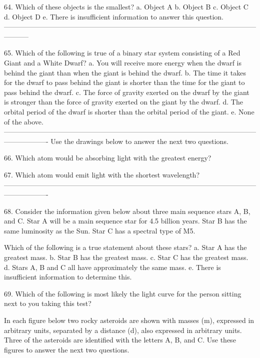 64. Which of these objects is the smallest?
a. Object A
b. Object B
c. Object C
d. Object D
e. There is insufficient information to answer this question.
-----------------------------------------------------------------------------------------------------------------------

65. Which of the following is true of a binary star system consisting of a Red Giant and a White Dwarf?
a. You will receive more energy when the dwarf is behind the giant than when the giant is behind the dwarf.
b. The time it takes for the dwarf to pass behind the giant is shorter than the time for the giant to pass behind the dwarf.
c. The force of gravity exerted on the dwarf by the giant is stronger than the force of gravity exerted on the giant by the dwarf.
d. The orbital period of the dwarf is shorter than the orbital period of the giant.
e. None of the above.
-------------------------------------------------------------------------------------------------------------------------------
Use the drawings below to answer the next two questions. 











66. Which atom would be absorbing light with the greatest energy? 


67. Which atom would emit light with the shortest wavelength? 
-------------------------------------------------------------------------------------------------------------------------------


68. Consider the information given below about three main sequence stars A, B, and C.
Star A will be a main sequence star for 4.5 billion years.
Star B has the same luminosity as the Sun.
Star C has a spectral type of M5.

Which of the following is a true statement about these stars?
a. Star A has the greatest mass.
b. Star B has the greatest mass.
c. Star C has the greatest mass.
d. Stars A, B and C all have approximately the same mass.
e. There is insufficient information to determine this. 



69. Which of the following is most likely the light curve for the person sitting next to you taking this test? 



In each figure below two rocky asteroids are shown with masses (m), expressed in arbitrary units, separated by a distance (d), also expressed in arbitrary units.  Three of the asteroids are identified with the letters A, B, and C.  Use these figures to answer the next two questions.


